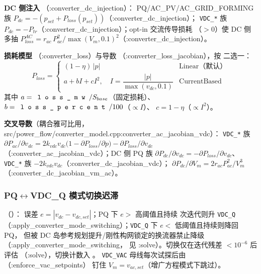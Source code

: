 \textbf{DC 侧注入} （:converter\_dc\_injection）：
PQ/AC\_PV/AC\_GRID\_FORMING 族 $P_{dc}=-(p_{set}+P_{loss}(p_{set}))$（:converter\_dc\_injection）；
\texttt{VDC\_*} 族 $P_{dc}=-P_{tr}$（:converter\_dc\_injection）；opt-in 交流传导损耗
（$>0$）使 DC 侧多抽
$P_{loss}^{AC}=r_{ac}\,P_{ac}^{2}/\max(V_m,0.1)^{2}$（:converter\_dc\_injection）。

\textbf{损耗模型} （:converter\_loss）与导数
（:converter\_loss\_jacobian），按  二选一：
\[
P_{loss}=\begin{cases}
(1-\eta)\,|p| & \text{Linear（默认）}\\[2pt]
a+bI+cI^{2},\quad I=\dfrac{|p|}{\max(v_{dc},0.1)} & \text{CurrentBased}
\end{cases}
\]
其中 $a=\fld{loss\_mw}/S_{base}$（固定损耗）、$b=\fld{loss\_percent}/100$（$\propto I$）、
$c=1-\eta$（$\propto I^2$）。

\textbf{交叉导数}（耦合雅可比用，src/power\_flow/converter\_model.cpp:converter\_ac\_jacobian\_vdc）：
\texttt{VDC\_*} 族
$\partial P_{ac}/\partial v_{dc}=2k_{vdc}v_{dc}\big(1-\partial P_{loss}/\partial p\big)-\partial P_{loss}/\partial v_{dc}$
（:converter\_ac\_jacobian\_vdc）；DC 侧 PQ 族 $\partial P_{dc}/\partial v_{dc}=-\partial P_{loss}/\partial v_{dc}$、
\texttt{VDC\_*} 族 $-2k_{vdc}v_{dc}$（:converter\_dc\_jacobian\_vdc）；
$\partial P_{dc}/\partial V_m=2r_{ac}P_{ac}^{2}/V_m^{3}$（:converter\_dc\_jacobian\_vm\_ac）。

\subsubsection*{PQ$\leftrightarrow$VDC\_Q 模式切换迟滞}
（）：
误差 $e=|v_{dc}-v_{dc,set}|$；PQ 下 $e>$ 高阈值且持续 
次迭代则升 \texttt{VDC\_Q}（:apply\_converter\_mode\_switching）；\texttt{VDC\_Q} 下 $e<$ 低阈值且持续则降回 PQ，
但被 DC 岛参考规划提升/刚性构网锁定的换流器禁止降级（:apply\_converter\_mode\_switching，
 见 :solve）。切换仅在迭代残差 $<10^{-6}$ 后评估
（:solve），切换计数入 。
\texttt{VDC\_VAC} 母线每次试探后由 （:enforce\_vac\_setpoints）
钉住 $V_m=v_{ac,set}$（增广方程模式下跳过）。

